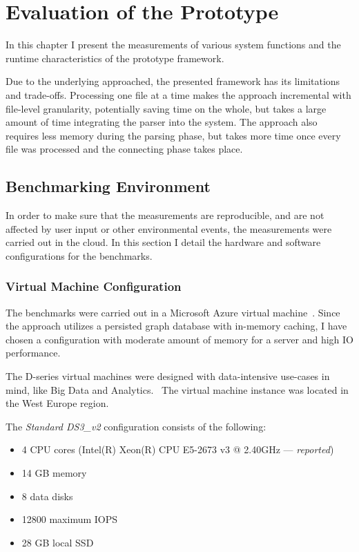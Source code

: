 \chapter{Evaluation of the Prototype}
\label{chap:evaluation-of-the-prototype}
In this chapter I present the measurements of various system functions and the runtime characteristics of the prototype framework.

Due to the underlying approached, the presented framework has its limitations and trade-offs. Processing one file at a time makes the approach incremental with file-level granularity, potentially saving time on the whole, but takes a large amount of time integrating the parser into the system. The approach also requires less memory during the parsing phase, but takes more time once every file was processed and the connecting phase takes place.

\section{Benchmarking Environment}
In order to make sure that the measurements are reproducible, and are not affected by user input or other environmental events, the measurements were carried out in the cloud. In this section I detail the hardware and software configurations for the benchmarks.

\subsection{Virtual Machine Configuration}
The benchmarks were carried out in a Microsoft Azure virtual machine~\cite{azure-vm}. Since the approach utilizes a persisted graph database with in-memory caching, I have chosen a configuration with moderate amount of memory for a server and high IO performance.

The D-series virtual machines were designed with data-intensive use-cases in mind, like Big Data and Analytics.~\cite{d-series} The virtual machine instance was located in the West Europe region.

The \emph{Standard DS3\_v2} configuration consists of the following:
\begin{itemize}[topsep=0pt]
  \item 4 CPU cores (Intel(R) Xeon(R) CPU E5-2673 v3 @ 2.40GHz --- \emph{reported})
  \item 14 GB memory
  \item 8 data disks
  \item 12800 maximum IOPS
  \item 28 GB local SSD
\end{itemize}


